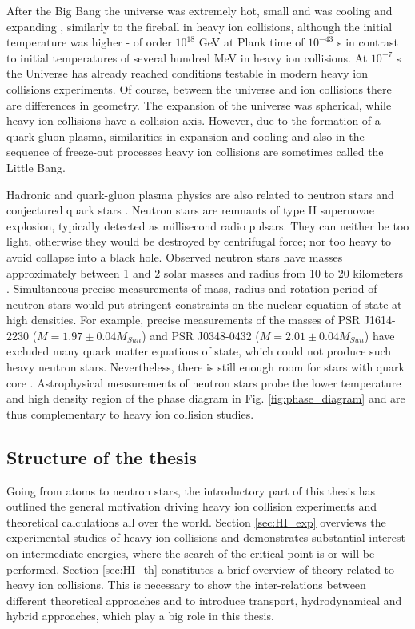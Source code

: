 After the Big Bang the universe was extremely hot, small and was cooling and
expanding \cite{Weinberg:1977ji}, similarly to the fireball in heavy ion
collisions, although the initial temperature was higher - of order
$10^{18}$ GeV at Plank time of $10^{-43}$ s in contrast to
initial temperatures of several hundred MeV in heavy ion collisions.
At $10^{-7}$ s the Universe has already reached conditions testable in
modern heavy ion collisions experiments.  Of course, between the universe and
ion collisions there are differences in geometry. The expansion of the universe
was spherical, while heavy ion collisions have a collision axis. However, due to
the formation of a quark-gluon plasma, similarities in expansion and cooling and
also in the sequence of freeze-out processes heavy ion collisions are sometimes
called the Little Bang.

Hadronic and quark-gluon plasma physics are also related to neutron stars and
conjectured quark stars \cite{Xu:2002wd}. Neutron stars are remnants of type II
supernovae explosion, typically detected as millisecond radio pulsars. They can
neither be too light, otherwise they would be destroyed by centrifugal force;
nor too heavy to avoid collapse into a black hole. Observed neutron stars have
masses approximately between 1 and 2 solar masses and radius from 10 to 20
kilometers \cite{Lattimer:2012nd}. Simultaneous precise measurements of mass,
radius and rotation period of neutron stars would put stringent constraints on
the nuclear equation of state at high densities. For example, precise
measurements of the masses of PSR J1614-2230 ($M =  1.97 \pm 0.04 M_{Sun}$)
and PSR J0348-0432 ($M = 2.01 \pm 0.04 M_{Sun}$)
\cite{Demorest:2010bx,Antoniadis:2013pzd} have excluded many quark matter
equations of state, which could not produce such heavy neutron stars.
Nevertheless, there is still enough room for stars with quark core
\cite{Alford:2013aca,Benic:2014jia}.  Astrophysical measurements of neutron
stars probe the lower temperature and high density region of the phase diagram
in Fig. \ref{fig:phase_diagram} and are thus complementary to heavy ion
collision studies.

\subsection{Structure of the thesis}

Going from atoms to neutron stars, the introductory part of this thesis has outlined
the general motivation driving heavy ion collision experiments and theoretical
calculations all over the world. Section \ref{sec:HI_exp} overviews the
experimental studies of heavy ion collisions and demonstrates substantial
interest on intermediate energies, where the search of the critical point is or
will be performed. Section \ref{sec:HI_th} constitutes a brief overview of theory
related to heavy ion collisions. This is necessary to show the inter-relations
between different theoretical approaches and to introduce transport, hydrodynamical
and hybrid approaches, which play a big role in this thesis.


